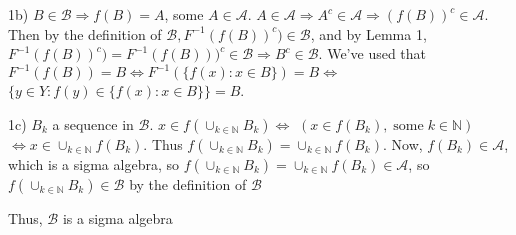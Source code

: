\documentclass[12pt]{article}
\begin{document}
\begin{flushleft}
1b) $B \in \mathcal{B} \Rightarrow f(B) = A$, some $A \in \mathcal{A}$. $A \in \mathcal{A} \Rightarrow A^c \in \mathcal{A} \Rightarrow (f(B))^c \in \mathcal{A}$. Then by the definition of $\mathcal{B}, F^{-1}(f(B))^c) \in \mathcal{B}$, and by Lemma 1, $F^{-1}(f(B))^c) = F^{-1}(f(B)))^c \in \mathcal{B} \Rightarrow B^c \in \mathcal{B}.$ We've used that $F^{-1}(f(B)) = B  \Leftrightarrow F^{-1}( \{ f(x): x \in B \} ) = B \Leftrightarrow$
$  \{ y \in Y : f(y) \in \{ f(x): x \in B \} \} = B$.
\end{flushleft}

\begin{flushleft}
1c) $B_k$ a sequence in $\mathcal{B}$. $x \in f(\cup_{k \in \mathbb{N}} B_k) \Leftrightarrow$	
$ \left( x \in f(B_k), \; \textrm{some} \; k \in \mathbb{N} \right)$
$\Leftrightarrow x \in \cup_{k \in \mathbb{N}} f(B_k)$. Thus $f(\cup_{k \in \mathbb{N}} B_k) = \cup_{k \in \mathbb{N}} f(B_k)$. Now, $f(B_k) \in \mathcal{A}$, which is a sigma algebra, so $f(\cup_{k \in \mathbb{N}} B_k) = \cup_{k \in \mathbb{N}} f(B_k)  \in \mathcal{A}$, so $f(\cup_{k \in \mathbb{N}} B_k) \in \mathcal{B}$ by the definition of $\mathcal{B}$
\end{flushleft}


\begin{flushleft}
Thus, $\mathcal{B}$ is a sigma algebra
\end{flushleft}
\end{document}
